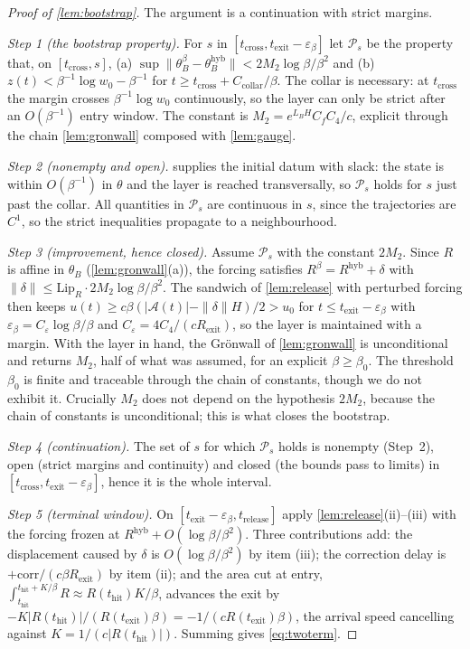 \documentclass[11pt]{article}
\theoremstyle{definition}
\theoremstyle{remark}
\newcommand{\thit}{t_{\mathrm{hit}}}
\newcommand{\texit}{t_{\mathrm{exit}}}
\newcommand{\trel}{t_{\mathrm{release}}}
\newcommand{\Ar}{\mathcal{A}}                      %
\newcommand{\hyb}{\mathrm{hyb}}
\begin{document}
\begin{proof}[Proof of \cref{lem:bootstrap}]
The argument is a continuation with strict margins.

\emph{Step 1 (the bootstrap property).} For $s$ in
$[t_{\mathrm{cross}},\texit-\varepsilon_\beta]$ let $\mathcal P_s$ be the
property that, on $[t_{\mathrm{cross}},s]$, (a)
$\sup\|\theta_B^\beta-\theta_B^{\hyb}\|<2M_2\log\beta/\beta^{2}$ and (b)
$z(t)<\beta^{-1}\log w_0-\beta^{-1}$ for $t\ge t_{\mathrm{cross}}+C_{\mathrm{collar}}/\beta$.
The collar is necessary: at $t_{\mathrm{cross}}$ the margin crosses
$\beta^{-1}\log w_0$ continuously, so the layer can only be strict after an
$O(\beta^{-1})$ entry window. The constant is
$M_2=e^{L_BH}C_fC_4/c$, explicit through the chain \cref{lem:gronwall} composed
with \cref{lem:gauge}.

\emph{Step 2 (nonempty and open).}  supplies the initial
datum with slack: the state is within $O(\beta^{-1})$ in $\theta$ and the layer is
reached transversally, so $\mathcal P_s$ holds for $s$ just past the collar. All
quantities in $\mathcal P_s$ are continuous in $s$, since the trajectories are
$C^1$, so the strict inequalities propagate to a neighbourhood.

\emph{Step 3 (improvement, hence closed).} Assume $\mathcal P_s$ with the
constant $2M_2$. Since $R$ is affine in $\theta_B$ (\cref{lem:gronwall}(a)), the
forcing satisfies $R^\beta=R^{\hyb}+\delta$ with
$\|\delta\|\le\mathrm{Lip}_R\cdot2M_2\log\beta/\beta^{2}$. The sandwich of
\cref{lem:release} with perturbed forcing then keeps
$u(t)\ge c\beta(|\Ar(t)|-\|\delta\|H)/2>u_0$ for $t\le\texit-\varepsilon_\beta$
with $\varepsilon_\beta=C_\varepsilon\log\beta/\beta$ and
$C_\varepsilon=4C_4/(cR_{\mathrm{exit}})$, so the layer is maintained with a
margin. With the layer in hand, the Gr\"onwall of \cref{lem:gronwall} is
unconditional and returns $M_2$, half of what was assumed, for an explicit
$\beta\ge\beta_0$. The threshold $\beta_0$ is finite and traceable through the
chain of constants, though we do not exhibit it. Crucially $M_2$ does not depend
on the hypothesis $2M_2$, because the chain of constants is unconditional; this
is what closes the bootstrap.

\emph{Step 4 (continuation).} The set of $s$ for which $\mathcal P_s$ holds is
nonempty (Step~2), open (strict margins and continuity) and closed (the bounds
pass to limits) in $[t_{\mathrm{cross}},\texit-\varepsilon_\beta]$, hence it is
the whole interval.

\emph{Step 5 (terminal window).} On
$[\texit-\varepsilon_\beta,\trel]$ apply \cref{lem:release}(ii)--(iii) with the
forcing frozen at $R^{\hyb}+O(\log\beta/\beta^{2})$. Three contributions add: the
displacement caused by $\delta$ is $O(\log\beta/\beta^{2})$ by item (iii); the
correction delay is $+\mathrm{corr}/(c\beta R_{\mathrm{exit}})$ by item (ii); and
the area cut at entry, $\int_{\thit}^{\thit+K/\beta}R\approx R(\thit)K/\beta$,
advances the exit by $-K|R(\thit)|/(R(\texit)\beta)=-1/(cR(\texit)\beta)$, the
arrival speed cancelling against $K=1/(c|R(\thit)|)$. Summing gives
\eqref{eq:twoterm}.
\end{proof}
\end{document}
